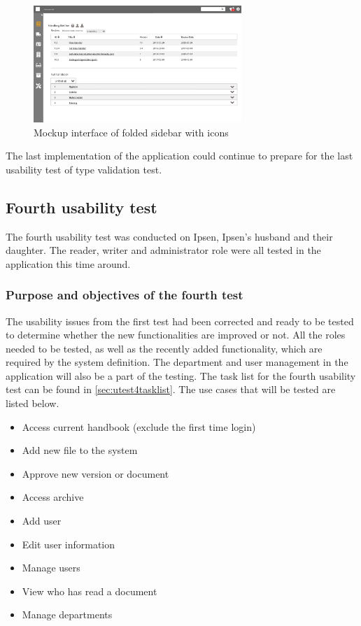 \documentclass[../../master.tex]{subfiles}
\begin{document}
\begin{figure}[H]
	\centering
		\includegraphics[width=0.7\textwidth]{billeder/ForsideFoldedSidebar.jpg}
	\caption{Mockup interface of folded sidebar with icons}\label{fig:mockupSidebarIcon}
\end{figure}

The last implementation of the application could continue to prepare for the last usability test of type validation test.

\subsection{Fourth usability test}\label{fourthtest}
The fourth usability test was conducted on Ipsen, Ipsen's husband and their daughter.
The reader, writer and administrator role were all tested in the application this time around.

\subsubsection*{Purpose and objectives of the fourth test}
The usability issues from the first test had been corrected and ready to be tested to determine whether the new functionalities are improved or not.
All the roles needed to be tested, as well as the recently added functionality, which are required by the system definition.
The department and user management in the application will also be a part of the testing.
The task list for the fourth usability test can be found in \cref{sec:utest4tasklist}.
The use cases that will be tested are listed below.

\begin{itemize}
	\item Access current handbook (exclude the first time login)
	\item Add new file to the system
	\item Approve new version or document
	\item Access archive
	\item Add user
	\item Edit user information
	\item Manage users
	\item View who has read a document
	\item Manage departments
\end{itemize}
\end{document}
